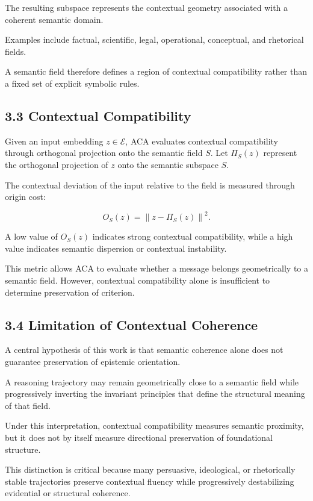 \documentclass[11pt]{article}
\begin{document}
The resulting subspace represents the contextual geometry associated with a coherent semantic domain.

Examples include factual, scientific, legal, operational, conceptual, and rhetorical fields.

A semantic field therefore defines a region of contextual compatibility rather than a fixed set of explicit symbolic rules.

\subsection{3.3 Contextual Compatibility}

Given an input embedding $z\in\mathcal{E}$, ACA evaluates contextual compatibility through orthogonal projection onto the semantic field $S$. Let $\Pi_S(z)$ represent the orthogonal projection of $z$ onto the semantic subspace $S$.

The contextual deviation of the input relative to the field is measured through origin cost:

$$
O_S(z)
=
\left\lVert z-\Pi_S(z)\right\rVert^2.
$$

A low value of $O_S(z)$ indicates strong contextual compatibility, while a high value indicates semantic dispersion or contextual instability.

This metric allows ACA to evaluate whether a message belongs geometrically to a semantic field. However, contextual compatibility alone is insufficient to determine preservation of criterion.

\subsection{3.4 Limitation of Contextual Coherence}

A central hypothesis of this work is that semantic coherence alone does not guarantee preservation of epistemic orientation.

A reasoning trajectory may remain geometrically close to a semantic field while progressively inverting the invariant principles that define the structural meaning of that field.

Under this interpretation, contextual compatibility measures semantic proximity, but it does not by itself measure directional preservation of foundational structure.

This distinction is critical because many persuasive, ideological, or rhetorically stable trajectories preserve contextual fluency while progressively destabilizing evidential or structural coherence.
\end{document}
